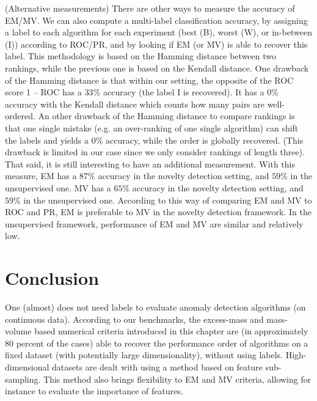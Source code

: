 \begin{remark}(Alternative measurements)
There are other ways to measure the accuracy of EM/MV.
We can also compute a multi-label classification accuracy, by assigning a label to each algorithm for each experiment (best (B), worst (W), or in-between (I)) according to ROC/PR, and by looking if EM (or MV) is able to recover this label.
This methodology is based on the Hamming distance between two rankings, while the previous one is based on the Kendall distance. One drawback of the Hamming distance is that within our setting, the opposite of the ROC score 1 – ROC has a $33\%$ accuracy (the label I is recovered). It has a $0\%$ accuracy with the Kendall distance which counts how many pairs are well-ordered. An other drawback of the Hamming distance to compare rankings is that one single mistake (e.g. an over-ranking of one single algorithm) can shift the labels and yields a $0\%$ accuracy, while the order is globally recovered. (This drawback is limited in our case since we only consider rankings of length three).
%
That said, it is still interesting to have an additional measurement. With this measure, 
EM has a $87\%$ accuracy in the novelty detection setting, and $59\%$ in the unsupervised one. MV has a $65\%$ accuracy in the novelty detection setting, and $59\%$ in the unsupervised one.
According to this way of comparing EM and MV to ROC and PR, EM is preferable to MV in the novelty detection framework. In the unsupervised framework, performance of EM and MV are similar and relatively low.
%
\end{remark}




\section{Conclusion}
One (almost) does not need labels to evaluate anomaly detection algorithms (on continuous data). According to our benchmarks, the excess-mass and mass-volume based numerical criteria introduced in this chapter are (in approximately $80$ percent of the cases) able to recover the performance order of algorithms on a fixed dataset (with potentially large dimensionality), without using labels. High-dimensional datasets are dealt with using a method based on feature sub-sampling. This method also brings flexibility to EM and MV criteria, allowing for instance to evaluate the importance of features.

